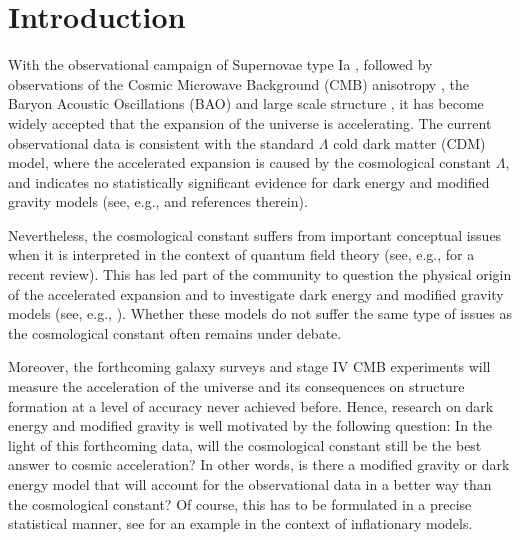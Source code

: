 \documentclass[nofootinbib,a4paper,aps,prd,10pt,superscriptaddress,reprint,showkeys,showpacs]{revtex4-1}
\begin{document}


\maketitle

\section{Introduction}
With the observational campaign of Supernovae type Ia \citep{Riess1998,Perlmutter1999,Riess2004,Riess2007}, 
followed by observations of the Cosmic Microwave Background (CMB) anisotropy \citep{Planck2016_XIII,Hinshaw2013}, the 
Baryon Acoustic Oscillations (BAO) \citep{Percival2010,Parkinson2012} and large scale structure  
\citep{Alam2017,Rota2017,Ata2018}, it has become widely accepted that the expansion of the universe is accelerating. 
The current observational data is consistent with the standard $\Lambda$ cold dark matter (CDM) model, where the 
accelerated expansion is caused by the cosmological constant $\Lambda$, and indicates no statistically significant 
evidence for dark energy and modified gravity models (see, e.g., \cite{Planck2016_XIV} and references therein).

Nevertheless, the cosmological constant suffers from important conceptual issues when it is interpreted in the context 
of quantum field theory (see, e.g., \cite{Weinberg2013} for a recent review). This has led part of the community to 
question the physical origin of the accelerated expansion and to investigate dark energy and modified gravity models 
(see, e.g., \cite{Clifton2012}). Whether these models do not suffer the same type of issues as the cosmological 
constant often remains under debate.

Moreover, the forthcoming galaxy surveys and stage IV CMB experiments will measure the acceleration of the universe and 
its consequences on structure formation at a level of accuracy never achieved before. Hence, research on dark energy 
and modified gravity is well motivated by the following question: In the light of this forthcoming data, will the 
cosmological constant still be the best answer to cosmic acceleration? In other words, is there a modified gravity 
or dark energy model that will account for the observational data in a better way than the cosmological constant? Of 
course, this has to be formulated in a precise statistical manner, see \cite{Giannantonio2015} for an example in 
the context of inflationary models.
\end{document}
